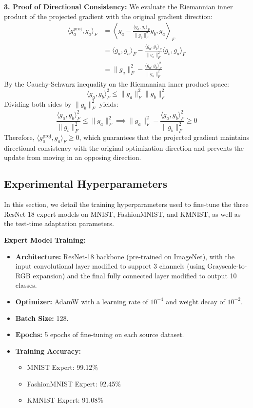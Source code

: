 \documentclass{article}
\theoremstyle{plain}
\theoremstyle{definition}
\theoremstyle{remark}
\begin{document}
\textbf{3. Proof of Directional Consistency:}
We evaluate the Riemannian inner product of the projected gradient with the original gradient direction:
\begin{align*}
\langle g_a^{\text{proj}}, g_a \rangle_F &= \left\langle g_a - \frac{\langle g_a, g_b \rangle_F}{\|g_b\|_F^2} g_b, g_a \right\rangle_F \\
&= \langle g_a, g_a \rangle_F - \frac{\langle g_a, g_b \rangle_F}{\|g_b\|_F^2} \langle g_b, g_a \rangle_F \\
&= \|g_a\|_F^2 - \frac{\langle g_a, g_b \rangle_F^2}{\|g_b\|_F^2}
\end{align*}
By the Cauchy-Schwarz inequality on the Riemannian inner product space:
\[
\langle g_a, g_b \rangle_F^2 \leq \|g_a\|_F^2 \|g_b\|_F^2
\]
Dividing both sides by $\|g_b\|_F^2$ yields:
\[
\frac{\langle g_a, g_b \rangle_F^2}{\|g_b\|_F^2} \leq \|g_a\|_F^2 \implies \|g_a\|_F^2 - \frac{\langle g_a, g_b \rangle_F^2}{\|g_b\|_F^2} \geq 0
\]
Therefore, $\langle g_a^{\text{proj}}, g_a \rangle_F \geq 0$, which guarantees that the projected gradient maintains directional consistency with the original optimization direction and prevents the update from moving in an opposing direction.

\subsection{Experimental Hyperparameters}
In this section, we detail the training hyperparameters used to fine-tune the three ResNet-18 expert models on MNIST, FashionMNIST, and KMNIST, as well as the test-time adaptation parameters.

\textbf{Expert Model Training:}
\begin{itemize}
    \item \textbf{Architecture:} ResNet-18 backbone (pre-trained on ImageNet), with the input convolutional layer modified to support 3 channels (using Grayscale-to-RGB expansion) and the final fully connected layer modified to output 10 classes.
    \item \textbf{Optimizer:} AdamW with a learning rate of $10^{-4}$ and weight decay of $10^{-2}$.
    \item \textbf{Batch Size:} 128.
    \item \textbf{Epochs:} 5 epochs of fine-tuning on each source dataset.
    \item \textbf{Training Accuracy:}
    \begin{itemize}
        \item MNIST Expert: 99.12\%
        \item FashionMNIST Expert: 92.45\%
        \item KMNIST Expert: 91.08\%
    \end{itemize}
\end{itemize}
\end{document}
